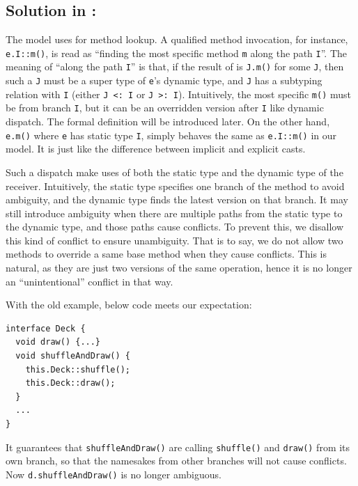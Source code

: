 \subsection{Solution in \MIM: \dispatchnamecaptical}\label{subsec:solutionmim}
The \MIM{} model uses \dispatchnameit{} for method lookup. A qualified
method invocation, for instance, \lstinline|e.I::m()|, is read as
``finding the most specific method \lstinline|m| along the path
\lstinline|I|''. The meaning of ``along the path \lstinline|I|'' is
that, if the result of \dispatch{} is \lstinline|J.m()| for some \lstinline|J|, then such a \lstinline|J| must be a super type of \lstinline|e|'s dynamic type, and \lstinline|J| has a subtyping relation with \lstinline|I| (either \lstinline|J <: I| or \lstinline|J >: I|). Intuitively, the most specific \lstinline|m()| must be from branch \lstinline|I|, but it can be an overridden version after \lstinline|I| like dynamic dispatch. The formal definition will be introduced later. On the other hand, \lstinline|e.m()| where \lstinline|e| has static type \lstinline|I|, simply behaves the same as \lstinline|e.I::m()| in our model. It is just like the difference between implicit and explicit casts.

Such a dispatch make uses of both the static type and the dynamic type of the receiver. Intuitively, the static type specifies one branch of the method to avoid ambiguity, and the dynamic type finds the latest version on that branch. It may still introduce ambiguity when there are multiple paths from the static type to the dynamic type, and those paths cause conflicts. To prevent this, we disallow this kind of conflict to ensure unambiguity. That is to say, we do not allow two methods to override a same base method when they cause conflicts. This is natural, as they are just two versions of the same operation, hence it is no longer an ``unintentional'' conflict in that way.

With the old example, below code meets our expectation:
\vspace{3pt}\begin{lstlisting}
interface Deck {
  void draw() {...}
  void shuffleAndDraw() {
    this.Deck::shuffle();
    this.Deck::draw();
  }
  ...
}
\end{lstlisting}\vspace{3pt}
It guarantees that \lstinline|shuffleAndDraw()| are calling \lstinline|shuffle()| and \lstinline|draw()| from its own branch, so that the namesakes
from other branches will not cause conflicts. Now \lstinline|d.shuffleAndDraw()| is no longer ambiguous.

